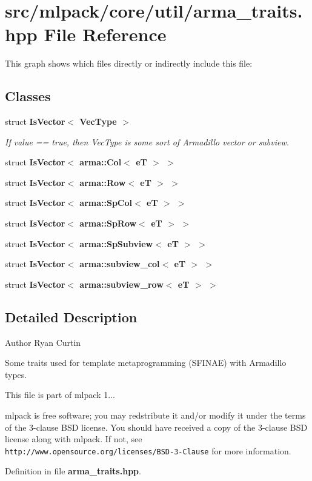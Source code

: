 \section{src/mlpack/core/util/arma\-\_\-traits.hpp File Reference}
\label{arma__traits_8hpp}
This graph shows which files directly or indirectly include this file\-:
\subsection*{Classes}
\begin{DoxyCompactItemize}
\item 
struct {\bf Is\-Vector$<$ Vec\-Type $>$}
\begin{DoxyCompactList}\small\item\em If value == true, then Vec\-Type is some sort of Armadillo vector or subview. \end{DoxyCompactList}\item 
struct {\bf Is\-Vector$<$ arma\-::\-Col$<$ e\-T $>$ $>$}
\item 
struct {\bf Is\-Vector$<$ arma\-::\-Row$<$ e\-T $>$ $>$}
\item 
struct {\bf Is\-Vector$<$ arma\-::\-Sp\-Col$<$ e\-T $>$ $>$}
\item 
struct {\bf Is\-Vector$<$ arma\-::\-Sp\-Row$<$ e\-T $>$ $>$}
\item 
struct {\bf Is\-Vector$<$ arma\-::\-Sp\-Subview$<$ e\-T $>$ $>$}
\item 
struct {\bf Is\-Vector$<$ arma\-::subview\-\_\-col$<$ e\-T $>$ $>$}
\item 
struct {\bf Is\-Vector$<$ arma\-::subview\-\_\-row$<$ e\-T $>$ $>$}
\end{DoxyCompactItemize}


\subsection{Detailed Description}
\begin{DoxyAuthor}{Author}
Ryan Curtin
\end{DoxyAuthor}
Some traits used for template metaprogramming (S\-F\-I\-N\-A\-E) with Armadillo types.

This file is part of mlpack 1...

mlpack is free software; you may redstribute it and/or modify it under the terms of the 3-\/clause B\-S\-D license. You should have received a copy of the 3-\/clause B\-S\-D license along with mlpack. If not, see {\tt http\-://www.\-opensource.\-org/licenses/\-B\-S\-D-\/3-\/\-Clause} for more information. 

Definition in file {\bf arma\-\_\-traits.\-hpp}.

